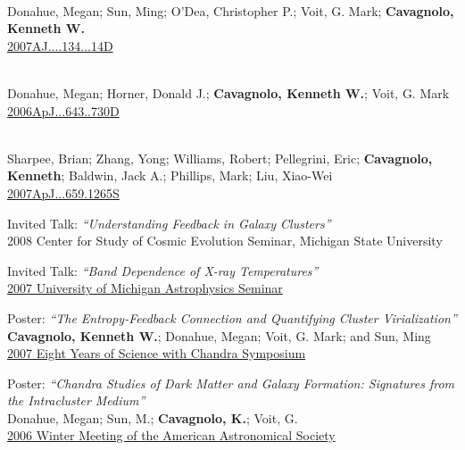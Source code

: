 \documentclass[11pt]{cv}
\begin{document}
\begin{llist}
{}\\
Donahue, Megan; Sun, Ming; O'Dea, Christopher P.; Voit, G. Mark; {\bf Cavagnolo, Kenneth W.}\\
\href{http://adsabs.harvard.edu/abs/2007AJ....134...14D}{2007AJ....134...14D}

{}\\
Donahue, Megan; Horner, Donald J.; {\bf Cavagnolo, Kenneth W.}; Voit, G. Mark\\
\href{http://adsabs.harvard.edu/abs/2006ApJ...643..730D}{2006ApJ...643..730D}

{}\\
Sharpee, Brian; Zhang, Yong; Williams, Robert; Pellegrini, Eric; {\bf Cavagnolo, Kenneth}; Baldwin, Jack A.; Phillips, Mark; Liu, Xiao-Wei\\
\href{http://adsabs.harvard.edu/abs/2007ApJ...659.1265S}{2007ApJ...659.1265S}



{\sc Invited Talk: {\textit{``Understanding Feedback in Galaxy Clusters''}}}\\
2008 Center for Study of Cosmic Evolution Seminar, Michigan State University

{\sc Invited Talk: {\textit{``Band Dependence of X-ray Temperatures''}}}\\
\href{http://www.pa.msu.edu/people/cavagnolo/annarbor_07.pdf}{2007
University of Michigan Astrophysics Seminar}

{\sc Poster: {\textit{``The Entropy-Feedback Connection and Quantifying Cluster Virialization''}}}\\
{\bf Cavagnolo, Kenneth W.}; Donahue, Megan; Voit, G. Mark; and Sun, Ming\\
\href{http://cxc.harvard.edu/symposium_2007/proceedings/posters//074_Cavagnolo.pdf}{2007
Eight Years of Science with Chandra Symposium}

{\sc Poster: {\textit{``Chandra Studies of Dark Matter and Galaxy Formation:
Signatures from the Intracluster Medium''}}}\\
Donahue, Megan; Sun, M.; {\bf Cavagnolo, K.}; Voit, G.\\
\href{http://adsabs.harvard.edu/abs/2006AAS...209.7711D}{2006 Winter
Meeting of the American Astronomical Society}


\end{llist}
\end{document}
